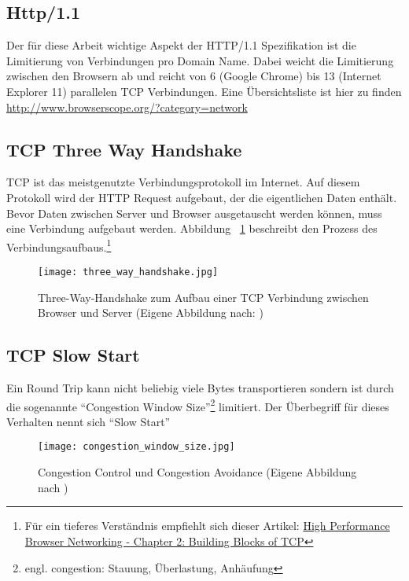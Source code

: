 	\subsection{Http/1.1}
	\label{sub:http_1_1}
		Der für diese Arbeit wichtige Aspekt der HTTP/1.1 Spezifikation ist die Limitierung von Verbindungen pro Domain Name. Dabei weicht die Limitierung zwischen den Browsern ab und reicht von 6 (Google Chrome) bis 13 (Internet Explorer 11) parallelen TCP Verbindungen. Eine Übersichtsliste ist hier zu finden \url{http://www.browserscope.org/?category=network}


	\subsection{TCP Three Way Handshake}
	\label{sub:tcp_three_way_handshake}
		TCP ist das meistgenutzte Verbindungsprotokoll im Internet. Auf diesem Protokoll wird der HTTP Request aufgebaut, der die eigentlichen Daten enthält.
		Bevor Daten zwischen Server und Browser ausgetauscht werden können, muss eine Verbindung aufgebaut werden. Abbildung ~\ref{fig:three_way_handshake} beschreibt den Prozess des Verbindungsaufbaus.\footnote{Für ein tieferes Verständnis empfiehlt sich dieser Artikel: \href{http://chimera.labs.oreilly.com/books/1230000000545/ch02.html}{High Performance Browser Networking - Chapter 2: Building Blocks of TCP}} 

		\begin{figure}[htbp]
			\begin{center}
				\texttt{[image: three\_way\_handshake.jpg]}
				\caption{Three-Way-Handshake zum Aufbau einer TCP Verbindung zwischen Browser und Server (Eigene Abbildung nach: \autocite{bos})}
				\label{fig:three_way_handshake}
			\end{center}
		\end{figure}

	\subsection{TCP Slow Start} %
	\label{sub:tcp_slow_start}

		Ein Round Trip kann nicht beliebig viele Bytes transportieren sondern ist durch die sogenannte "`Congestion Window Size"'\footnote{engl. congestion: Stauung, Überlastung, Anhäufung} limitiert. Der Überbegriff für dieses Verhalten nennt sich "`Slow Start"'

		\begin{figure}[htbp]
			\begin{center}
				\texttt{[image: congestion\_window\_size.jpg]}
				\caption{Congestion Control und Congestion Avoidance (Eigene Abbildung nach \autocite{grigorikSlowStart})}
				\label{fig:congestion_window_size}
			\end{center}
		\end{figure} 

